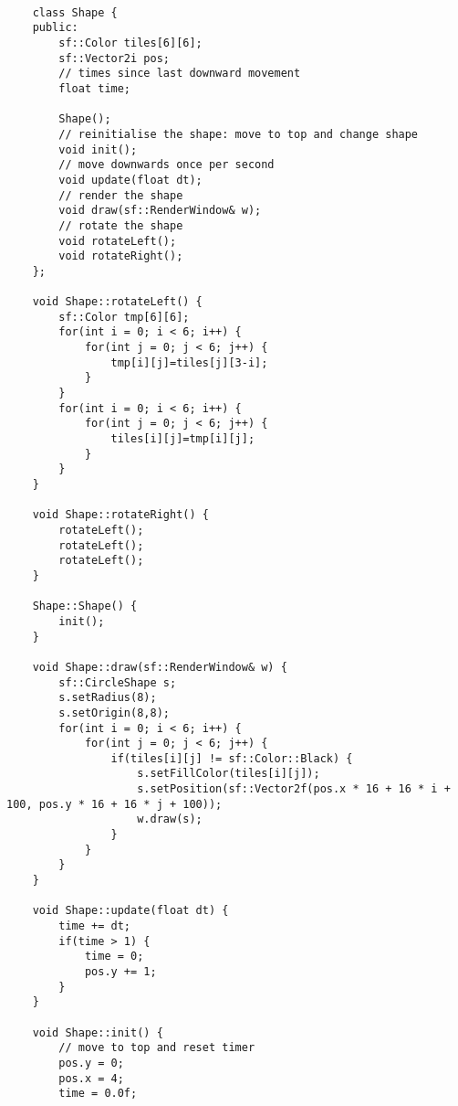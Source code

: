 \documentclass[11pt]{amsart}
\begin{document}
\begin{verbatim}

	class Shape {
	public:
	    sf::Color tiles[6][6];
	    sf::Vector2i pos;
	    // times since last downward movement
	    float time;

	    Shape();
	    // reinitialise the shape: move to top and change shape
	    void init();
	    // move downwards once per second
	    void update(float dt);
	    // render the shape
	    void draw(sf::RenderWindow& w);
	    // rotate the shape
	    void rotateLeft();
	    void rotateRight();
	};

	void Shape::rotateLeft() {
	    sf::Color tmp[6][6];
	    for(int i = 0; i < 6; i++) {
	        for(int j = 0; j < 6; j++) {
	            tmp[i][j]=tiles[j][3-i];
	        }
	    }
	    for(int i = 0; i < 6; i++) {
	        for(int j = 0; j < 6; j++) {
	            tiles[i][j]=tmp[i][j];
	        }
	    }
	}

	void Shape::rotateRight() {
	    rotateLeft();
	    rotateLeft();
	    rotateLeft();
	}

	Shape::Shape() {
	    init();
	}

	void Shape::draw(sf::RenderWindow& w) {
	    sf::CircleShape s;
	    s.setRadius(8);
	    s.setOrigin(8,8);
	    for(int i = 0; i < 6; i++) {
	        for(int j = 0; j < 6; j++) {
	            if(tiles[i][j] != sf::Color::Black) {
	                s.setFillColor(tiles[i][j]);
	                s.setPosition(sf::Vector2f(pos.x * 16 + 16 * i + 100, pos.y * 16 + 16 * j + 100));
	                w.draw(s);
	            }
	        }
	    }
	}

	void Shape::update(float dt) {
	    time += dt;
	    if(time > 1) {
	        time = 0;
	        pos.y += 1;
	    }
	}

	void Shape::init() {
	    // move to top and reset timer
	    pos.y = 0;
	    pos.x = 4;
	    time = 0.0f;


\end{verbatim}
\end{document}
